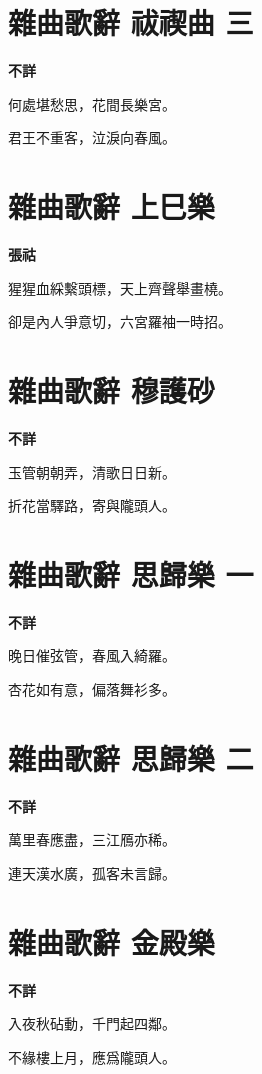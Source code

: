 \documentclass[12pt,a4paper]{ctexbook}
\begin{document}
\section{雜曲歌辭 祓禊曲 三}
\textbf{不詳}\par\vspace{0.5em}
何處堪愁思，花間長樂宮。\par
君王不重客，泣淚向春風。\par

\section{雜曲歌辭 上巳樂}
\textbf{張祜}\par\vspace{0.5em}
猩猩血綵繫頭標，天上齊聲舉畫橈。\par
卻是內人爭意切，六宮羅袖一時招。\par

\section{雜曲歌辭 穆護砂}
\textbf{不詳}\par\vspace{0.5em}
玉管朝朝弄，清歌日日新。\par
折花當驛路，寄與隴頭人。\par

\section{雜曲歌辭 思歸樂 一}
\textbf{不詳}\par\vspace{0.5em}
晚日催弦管，春風入綺羅。\par
杏花如有意，偏落舞衫多。\par

\section{雜曲歌辭 思歸樂 二}
\textbf{不詳}\par\vspace{0.5em}
萬里春應盡，三江鴈亦稀。\par
連天漢水廣，孤客未言歸。\par

\section{雜曲歌辭 金殿樂}
\textbf{不詳}\par\vspace{0.5em}
入夜秋砧動，千門起四鄰。\par
不緣樓上月，應爲隴頭人。\par
\end{document}
